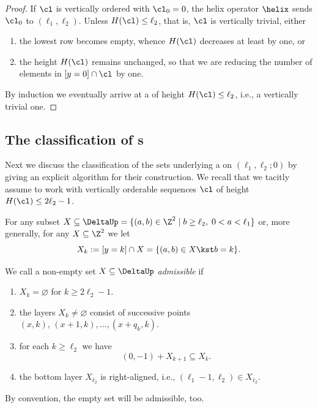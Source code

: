 \begin{proof}
If $\cl$ is vertically ordered with $\cl_0=0$, 
the helix operator $\helix$ sends $\cl_0$ to
$(\ell_1,\ell_2)$. Unless $H(\cl)\leq \ell_2$, 
that is, $\cl$ is vertically trivial, either 
\begin{enumerate}
\item[(i)]
the lowest row becomes empty, whence $H(\cl)$ 
decreases at least by one, or
\vspace{1ex}
\item[(ii)]
the height $H(\cl)$ remains unchanged, so that 
we are reducing the number of elements in 
$[y=0]\cap\cl$ by one.
\end{enumerate}
By induction we eventually arrive at a {\mes} 
of height $H(\cl)\leq\ell_2$, i.e., a 
vertically trivial one.
\end{proof}

\subsection{The classification of {\mes}s}
\label{subsec:ClassProdCase}
Next we discuss the classification of the
sets underlying a {\mes} on 
$(\ell_1,\ell_2;0)$ by giving an explicit 
algorithm for their construction. We recall
that we tacitly assume to work with
vertically orderable sequences $\cl$ of height
$H(\cl)\leq2\ell_2-1$.

For any subset $X\subseteq\DeltaUp=
\{(a,b)\in\Z^2\mid b\geq\ell_2,\; 
0<a<\ell_1\}$ 
or, more generally, for any
$X\subseteq\Z^2$ we let
$$
X_k:=[y=k]\cap X=\{(a,b)\in X\kst b=k\}.
$$

\begin{defi}
\label{def:AdmSetPC}
We call a non-empty set $X\subseteq
\DeltaUp$ {\em admissible} if
\begin{enumerate}
\item[(Ai)]
$X_k=\varnothing$ for $k\geq 2\ell_2-1$.
\vspace{1ex}
\item[(Aii)]
the layers $X_k\not=\varnothing$ consist 
of successive points $(x,k),\,(x+1,k),
\ldots,(x+q_k,k)$.
\vspace{1ex}
\item[(Aiii)]
for each $k\geq\ell_2$ we have 
$$
(0,-1)+X_{k+1}\subseteq X_k.
$$
\item[(Aiv)]
the bottom layer $X_{\ell_2}$ is 
right-aligned, i.e., $(\ell_1-1,\ell_2)
\in X_{\ell_2}$.
\end{enumerate}

By convention, the empty set will be 
admissible, too.
\end{defi}

